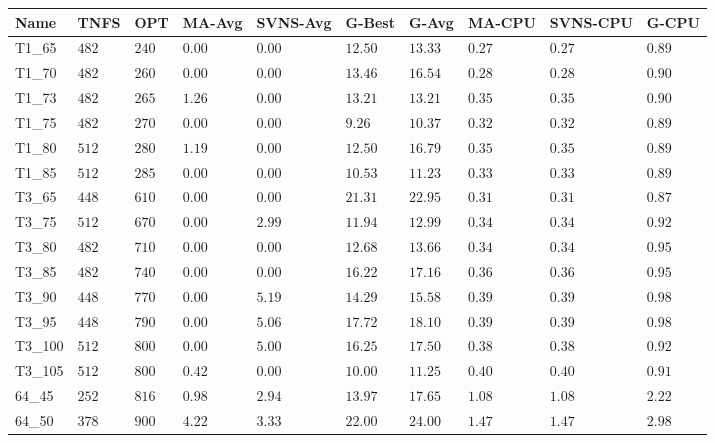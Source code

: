 \begin{center}
\begin{table}[]
\centering
\begin{tabular}{|lll|l|l|ll|lll|}
\hline
Name    & TNFS    & OPT    & MA-Avg & SVNS-Avg & G-Best   & G-Avg   & MA-CPU & SVNS-CPU & G-CPU \\
\hline
T1\_65  & $482   $& $240 $ & $\bm{0.00}$ & $\bm{0.00}$   & $12.50$  & $13.33$ & $0.27$ & $0.27$ & $0.89$ \\
T1\_70  & $482   $& $260 $ & $\bm{0.00}$ & $\bm{0.00}$   & $13.46$  & $16.54$ & $0.28$ & $0.28$ & $0.90$ \\
T1\_73  & $482   $& $265 $ & $1.26$ & $\bm{0.00}$   & $13.21$  & $13.21$ & $0.35$ & $0.35$ & $0.90$ \\
T1\_75  & $482   $& $270 $ & $\bm{0.00}$ & $\bm{0.00}$   & $9.26 $  & $10.37$ & $0.32$ & $0.32$ & $0.89$ \\
T1\_80  & $512   $& $280 $ & $1.19$ & $\bm{0.00}$   & $12.50$  & $16.79$ & $0.35$ & $0.35$ & $0.89$ \\
T1\_85  & $512   $& $285 $ & $\bm{0.00}$ & $\bm{0.00}$   & $10.53$  & $11.23$ & $0.33$ & $0.33$ & $0.89$ \\
\hline
T3\_65  & $448   $& $610 $ & $\bm{0.00}$ & $\bm{0.00}$   & $21.31$  & $22.95$ & $0.31$ & $0.31$ & $0.87$ \\
T3\_75  & $512   $& $670 $ & $\bm{0.00}$ & $2.99$   & $11.94$  & $12.99$ & $0.34$ & $0.34$ & $0.92$ \\
T3\_80  & $482   $& $710 $ & $\bm{0.00}$ & $\bm{0.00}$   & $12.68$  & $13.66$ & $0.34$ & $0.34$ & $0.95$ \\
T3\_85  & $482   $& $740 $ & $\bm{0.00}$ & $\bm{0.00}$   & $16.22$  & $17.16$ & $0.36$ & $0.36$ & $0.95$ \\
T3\_90  & $448   $& $770 $ & $\bm{0.00}$ & $5.19$   & $14.29$  & $15.58$ & $0.39$ & $0.39$ & $0.98$ \\
T3\_95  & $448   $& $790 $ & $\bm{0.00}$ & $5.06$   & $17.72$  & $18.10$ & $0.39$ & $0.39$ & $0.98$ \\
T3\_100 & $512   $& $800 $ & $\bm{0.00}$ & $5.00$   & $16.25$  & $17.50$ & $0.38$ & $0.38$ & $0.92$ \\
T3\_105 & $512   $& $800 $ & $0.42$ & $\bm{0.00}$   & $10.00$  & $11.25$ & $0.40$ & $0.40$ & $0.91$ \\
\hline
64\_45  & $252   $& $816 $ & $0.98$ & $2.94$   & $13.97$  & $17.65$ & $1.08$ & $1.08$ & $2.22$ \\
64\_50  & $378   $& $900 $ & $4.22$ & $3.33$   & $22.00$  & $24.00$ & $1.47$ & $1.47$ & $2.98$ \\

\end{tabular}
\end{table}
\end{center}
